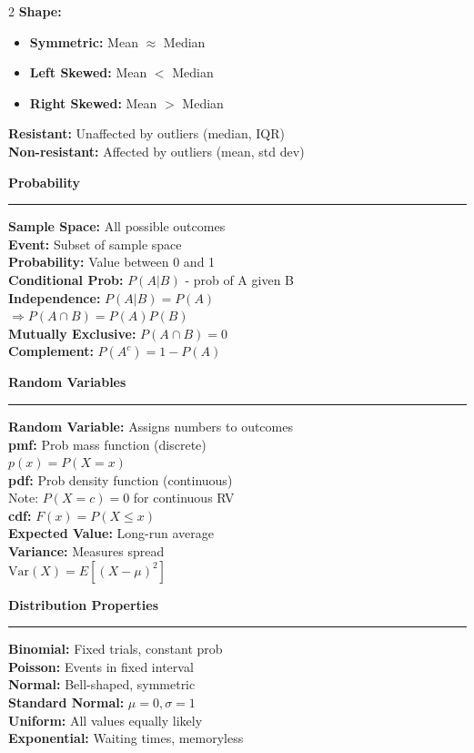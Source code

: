 \documentclass[10pt, letterpaper]{article}
\newcommand{\sectionhead}[1]{%
    \begin{center}%
    \large\bfseries#1%
    \end{center}%
    \vspace{-2mm}%
    \hrule%
    \vspace{2mm}%
}
\begin{document}
\begin{multicols}{2}
\textbf{Shape:}
\begin{itemize}
    \item \textbf{Symmetric:} Mean $\approx$ Median
    \item \textbf{Left Skewed:} Mean $<$ Median
    \item \textbf{Right Skewed:} Mean $>$ Median
\end{itemize}

\textbf{Resistant:} Unaffected by outliers (median, IQR) \\
\textbf{Non-resistant:} Affected by outliers (mean, std dev)

\columnbreak

\sectionhead{Probability}

\textbf{Sample Space:} All possible outcomes \\
\textbf{Event:} Subset of sample space \\
\textbf{Probability:} Value between 0 and 1 \\
\textbf{Conditional Prob:} $P(A|B)$ - prob of A given B \\
\textbf{Independence:} $P(A|B) = P(A)$ \\
$\Rightarrow P(A \cap B) = P(A)P(B)$ \\
\textbf{Mutually Exclusive:} $P(A \cap B) = 0$ \\
\textbf{Complement:} $P(A^c) = 1 - P(A)$

\sectionhead{Random Variables}

\textbf{Random Variable:} Assigns numbers to outcomes \\
\textbf{pmf:} Prob mass function (discrete) \\
$p(x) = P(X = x)$ \\
\textbf{pdf:} Prob density function (continuous) \\
Note: $P(X = c) = 0$ for continuous RV \\
\textbf{cdf:} $F(x) = P(X \leq x)$ \\
\textbf{Expected Value:} Long-run average \\
\textbf{Variance:} Measures spread \\
$\text{Var}(X) = E[(X - \mu)^2]$

\sectionhead{Distribution Properties}

\textbf{Binomial:} Fixed trials, constant prob \\
\textbf{Poisson:} Events in fixed interval \\
\textbf{Normal:} Bell-shaped, symmetric \\
\textbf{Standard Normal:} $\mu = 0, \sigma = 1$ \\
\textbf{Uniform:} All values equally likely \\
\textbf{Exponential:} Waiting times, memoryless

\end{multicols}
\end{document}
